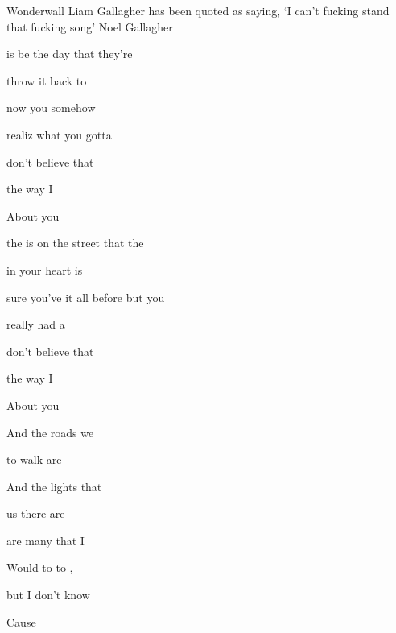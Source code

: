 \begin{SBSong}{Wonderwall}
  {Liam Gallagher has been quoted as saying, `I can't fucking stand that fucking song'}
  {Noel Gallagher}
  \begin{SBVerse}
     is  be the day that they're 
    
     throw it back to 
    
     now you  somehow 
    
    realiz what you gotta 
    
     don't believe that 
    
     the way I 
    
    About you   
  \end{SBVerse}
  \begin{SBVerse}
     the  is on the street that the 
    
     in your heart is 
    
     sure you've  it all before but you 
    
     really had a 
    
     don't believe that 
    
     the way I 
    
    About you   
  \end{SBVerse}
  \begin{SBVerse}
    And  the roads we 
    
     to walk are 
    
    And  the lights that 
    
     us there are 
    
     are many  that I 
    
    Would  to  to , 
    
    but I don't know 
  \end{SBVerse}
  \CBPageBrk\WBPageBrk
  \begin{SBVerse}
    Cause    
    

\end{SBVerse}
\end{SBSong}
